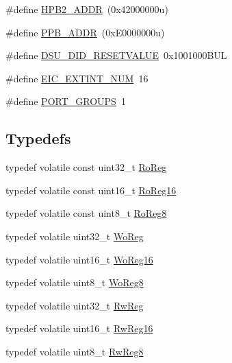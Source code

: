\begin{DoxyCompactItemize}
\item 
\#define \mbox{\hyperlink{group___s_a_m_d21_e17_a__definitions_gaef42fa53ddf169a2a50be70d29f73571}{H\+P\+B2\+\_\+\+A\+D\+DR}}~(0x42000000u)
\item 
\#define \mbox{\hyperlink{group___s_a_m_d21_e17_a__definitions_ga8895d0a3a9a3126cc44330f86c8ce564}{P\+P\+B\+\_\+\+A\+D\+DR}}~(0x\+E0000000u)
\item 
\#define \mbox{\hyperlink{group___s_a_m_d21_e17_a__definitions_gada75131d542c9e1966238f5488f89bd6}{D\+S\+U\+\_\+\+D\+I\+D\+\_\+\+R\+E\+S\+E\+T\+V\+A\+L\+UE}}~0x1001000\+B\+UL
\item 
\#define \mbox{\hyperlink{group___s_a_m_d21_e17_a__definitions_ga88ebc38c95506296f5d21f82476296ae}{E\+I\+C\+\_\+\+E\+X\+T\+I\+N\+T\+\_\+\+N\+UM}}~16
\item 
\#define \mbox{\hyperlink{group___s_a_m_d21_e17_a__definitions_gab9243ffe03a1dc631b57a495b4b3d467}{P\+O\+R\+T\+\_\+\+G\+R\+O\+U\+PS}}~1
\end{DoxyCompactItemize}
\subsection*{Typedefs}
\begin{DoxyCompactItemize}
\item 
typedef volatile const uint32\+\_\+t \mbox{\hyperlink{group___s_a_m_d21_e17_a__definitions_ga5d556f8391af4141be23f7334ac9dd68}{Ro\+Reg}}
\item 
typedef volatile const uint16\+\_\+t \mbox{\hyperlink{group___s_a_m_d21_e17_a__definitions_gaebf6e33c2d49a802e06e22a95ea9d0d0}{Ro\+Reg16}}
\item 
typedef volatile const uint8\+\_\+t \mbox{\hyperlink{group___s_a_m_d21_e17_a__definitions_ga0d957f1433aaf5d70e4dc2b68288442d}{Ro\+Reg8}}
\item 
typedef volatile uint32\+\_\+t \mbox{\hyperlink{group___s_a_m_d21_e17_a__definitions_gac0f96d4e8018367b38f527007cf0eafd}{Wo\+Reg}}
\item 
typedef volatile uint16\+\_\+t \mbox{\hyperlink{group___s_a_m_d21_e17_a__definitions_ga0ab0e5f6c8301aa1c2068e511d854094}{Wo\+Reg16}}
\item 
typedef volatile uint8\+\_\+t \mbox{\hyperlink{group___s_a_m_d21_e17_a__definitions_ga5e336e5a36ee12ebeafb021108e5275b}{Wo\+Reg8}}
\item 
typedef volatile uint32\+\_\+t \mbox{\hyperlink{group___s_a_m_d21_e17_a__definitions_gacf1496e3bbe303e55f627fc7558a68c7}{Rw\+Reg}}
\item 
typedef volatile uint16\+\_\+t \mbox{\hyperlink{group___s_a_m_d21_e17_a__definitions_gacce07556c80fc352ae607f225f19fed5}{Rw\+Reg16}}
\item 
typedef volatile uint8\+\_\+t \mbox{\hyperlink{group___s_a_m_d21_e17_a__definitions_gae361754be775bb192f85821d3ab33c17}{Rw\+Reg8}}
\end{DoxyCompactItemize}


